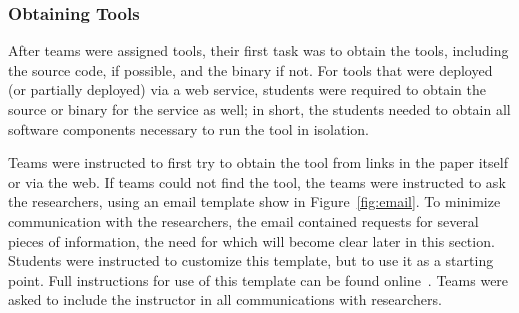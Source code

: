 \documentclass[10pt,conference]{IEEEtran}
\begin{document}
\subsubsection{Obtaining Tools}

After teams were assigned tools, their first task was to 
obtain the tools, including the source code, if possible,
and the binary if not.
For tools that were deployed (or partially deployed) via a web service, 
students were required to obtain the source or binary for
the service as well; in short, the students needed to
obtain all software components necessary to run the tool
in isolation. 

Teams were instructed to first try to 
obtain the tool from links in the paper itself or via
the web.
If teams could not find the tool, the teams
were instructed to ask the researchers, using an email
template show in Figure~\ref{fig:email}.
To minimize communication with the researchers, 
the email contained requests for several
pieces of information, the need for which will become 
clear later in this section.
Students were instructed to customize this template,
but to use it as a starting point. 
Full instructions for use of this template can be found 
online~\cite{email}.
Teams were asked to include the instructor in
all communications with researchers.
\end{document}

